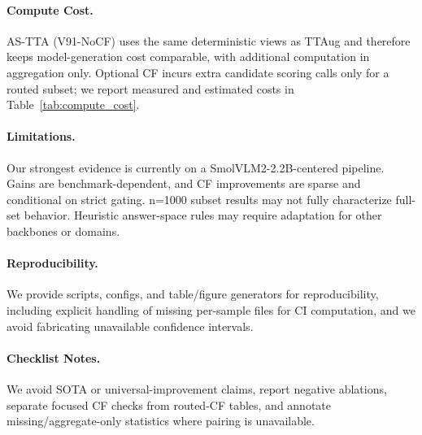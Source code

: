 \paragraph{Compute Cost.}
AS-TTA (V91-NoCF) uses the same deterministic views as TTAug and therefore keeps model-generation cost comparable, with additional computation in aggregation only. Optional CF incurs extra candidate scoring calls only for a routed subset; we report measured and estimated costs in Table~\ref{tab:compute_cost}.

\paragraph{Limitations.}
Our strongest evidence is currently on a SmolVLM2-2.2B-centered pipeline. Gains are benchmark-dependent, and CF improvements are sparse and conditional on strict gating. n=1000 subset results may not fully characterize full-set behavior. Heuristic answer-space rules may require adaptation for other backbones or domains.

\paragraph{Reproducibility.}
We provide scripts, configs, and table/figure generators for reproducibility, including explicit handling of missing per-sample files for CI computation, and we avoid fabricating unavailable confidence intervals.

\paragraph{Checklist Notes.}
We avoid SOTA or universal-improvement claims, report negative ablations, separate focused CF checks from routed-CF tables, and annotate missing/aggregate-only statistics where pairing is unavailable.

% 
% 
% 
% 
% 
% 
